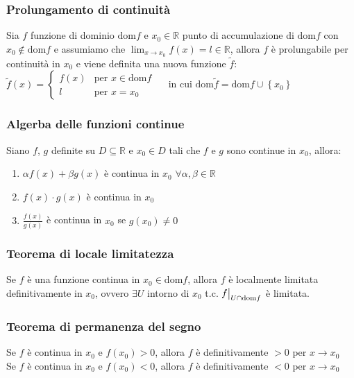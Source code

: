 \documentclass[a4paper]{article}
\newcommand\restr[2]{{%
	\left.\kern-\nulldelimiterspace %
	#1 %
	\vphantom{\big|} %
	\right|_{#2} %
	}}
\newcommand\dom{\text{dom}}
\begin{document}
\subsubsection*{Prolungamento di continuità}
Sia \(f\) funzione di dominio \(\dom f\) e \(x_0 \in \mathbb{R}\) punto di accumulazione di \(\dom f\) con \(x_0 \notin \dom f\)
e assumiamo che \(\displaystyle \lim_{x \to x_0} f(x) = l \in \mathbb{R}\), allora \(f\) è prolungabile per continuità in \(x_0\)
e viene definita una nuova funzione \(\widetilde{f}\): \\
\(\displaystyle \widetilde{f}(x) = \begin{cases}
	f(x) &\text{per } x \in \dom f \\
	l &\text{per } x = x_0
\end{cases} \quad\)
in cui \(\dom \widetilde{f} = \dom f \cup \left\{ x_0 \right\}\)

\subsubsection*{Algerba delle funzioni continue}
Siano \(f\), \(g\) definite su \(D \subseteq \mathbb{R}\) e \(x_0 \in D\) tali che \(f\) e \(g\) sono continue in \(x_0\), allora:
\begin{enumerate}
	\item \(\alpha f(x) + \beta g(x)\) è continua in \(x_0\) \(\forall \alpha, \beta \in \mathbb{R}\)
	\item \(f(x) \cdot g(x)\) è continua in \(x_0\)
	\item \(\displaystyle \frac{f(x)}{g(x)}\) è continua in \(x_0\) se \(g(x_0) \neq 0\)
\end{enumerate}

\subsubsection*{Teorema di locale limitatezza}
Se \(f\) è una funzione continua in \(x_0 \in \dom f\), allora \(f\) è localmente limitata definitivamente in \(x_0\), ovvero
\(\exists U\) intorno di \(x_0\) t.c. \(\restr{f}{U \cap \dom f}\) è limitata.

\subsubsection*{Teorema di permanenza del segno}
Se \(f\) è continua in \(x_0\) e \(f(x_0) > 0\), allora \(f\) è definitivamente \(> 0\) per \(x \to x_0\) \\
Se \(f\) è continua in \(x_0\) e \(f(x_0) < 0\), allora \(f\) è definitivamente \(< 0\) per \(x \to x_0\)
\end{document}
